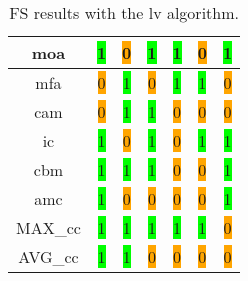 \begin{table}[H]
\begin{tabular}{|c|c|c|c|c|c|c|}
        \acrshort{moa} & \colorbox{lime}{1} & \colorbox{orange}{0} & \colorbox{lime}{1} & \colorbox{lime}{1} & \colorbox{orange}{0} & \colorbox{lime}{1} \\ \hline
        \acrshort{mfa} & \colorbox{orange}{0} & \colorbox{lime}{1} & \colorbox{orange}{0} & \colorbox{lime}{1} & \colorbox{lime}{1} & \colorbox{orange}{0} \\ \hline
        \acrshort{cam} & \colorbox{orange}{0} & \colorbox{lime}{1} & \colorbox{lime}{1} & \colorbox{orange}{0} & \colorbox{orange}{0} & \colorbox{orange}{0} \\ \hline
        \acrshort{ic} & \colorbox{lime}{1} & \colorbox{orange}{0} & \colorbox{lime}{1} & \colorbox{orange}{0} & \colorbox{lime}{1} & \colorbox{lime}{1} \\ \hline
        \acrshort{cbm} & \colorbox{lime}{1} & \colorbox{lime}{1} & \colorbox{lime}{1} & \colorbox{orange}{0} & \colorbox{orange}{0} & \colorbox{lime}{1} \\ \hline
        \acrshort{amc} & \colorbox{lime}{1} & \colorbox{orange}{0} & \colorbox{orange}{0} & \colorbox{orange}{0} & \colorbox{orange}{0} & \colorbox{lime}{1} \\ \hline
        MAX\_\acrshort{cc} & \colorbox{lime}{1} & \colorbox{lime}{1} & \colorbox{lime}{1} & \colorbox{lime}{1} & \colorbox{lime}{1} & \colorbox{orange}{0} \\ \hline
        AVG\_\acrshort{cc} & \colorbox{lime}{1} & \colorbox{lime}{1} & \colorbox{orange}{0} & \colorbox{orange}{0} & \colorbox{orange}{0} & \colorbox{orange}{0} \\ \hline
    \end{tabular}
\caption{FS results with the \acrlong{lv} algorithm.}
\label{tab:lv-output}
\end{table}